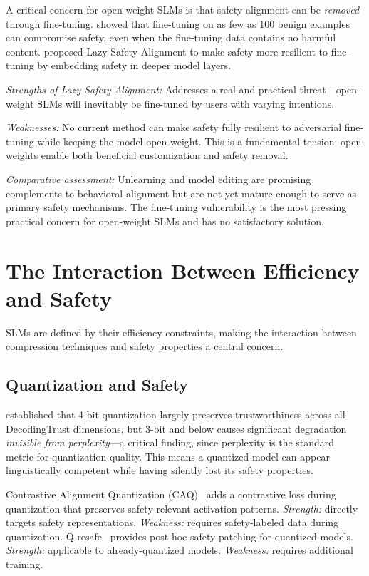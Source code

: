 \documentclass[12pt,a4paper]{article}
\begin{document}
A critical concern for open-weight SLMs is that safety alignment can be \emph{removed} through fine-tuning. \citet{qi2024finetuning} showed that fine-tuning on as few as 100 benign examples can compromise safety, even when the fine-tuning data contains no harmful content. \citet{huang2024lazy} proposed Lazy Safety Alignment to make safety more resilient to fine-tuning by embedding safety in deeper model layers.

\emph{Strengths of Lazy Safety Alignment:} Addresses a real and practical threat---open-weight SLMs will inevitably be fine-tuned by users with varying intentions.

\emph{Weaknesses:} No current method can make safety fully resilient to adversarial fine-tuning while keeping the model open-weight. This is a fundamental tension: open weights enable both beneficial customization and safety removal.

\emph{Comparative assessment:} Unlearning and model editing are promising complements to behavioral alignment but are not yet mature enough to serve as primary safety mechanisms. The fine-tuning vulnerability is the most pressing practical concern for open-weight SLMs and has no satisfactory solution.

\section{The Interaction Between Efficiency and Safety}\label{sec:efficiency}

SLMs are defined by their efficiency constraints, making the interaction between compression techniques and safety properties a central concern.

\subsection{Quantization and Safety}

\citet{hong2024compressed} established that 4-bit quantization largely preserves trustworthiness across all DecodingTrust dimensions, but 3-bit and below causes significant degradation \emph{invisible from perplexity}---a critical finding, since perplexity is the standard metric for quantization quality. This means a quantized model can appear linguistically competent while having silently lost its safety properties.

Contrastive Alignment Quantization (CAQ)~\citep{wee2025caq} adds a contrastive loss during quantization that preserves safety-relevant activation patterns. \emph{Strength:} directly targets safety representations. \emph{Weakness:} requires safety-labeled data during quantization. Q-resafe~\citep{chen2025qresafe} provides post-hoc safety patching for quantized models. \emph{Strength:} applicable to already-quantized models. \emph{Weakness:} requires additional training.
\end{document}
